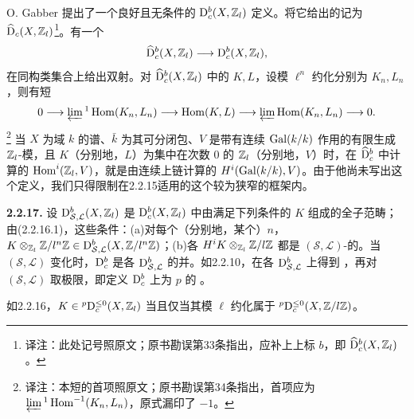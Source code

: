 O. Gabber 提出了一个良好且无条件的 $\mathrm{D}_c^b(X,\mathbb Z_l)$ 定义。将它给出的记为 $\widehat{\mathrm{D}}_c(X,\mathbb Z_l)$\footnote{译注：此处记号照原文；原书勘误第33条指出，应补上上标 $b$，即 $\widehat{\mathrm{D}}_c^b(X,\mathbb Z_l)$。}。有一个
\[
 \widehat{\mathrm{D}}_c^b(X,\mathbb Z_l)\longrightarrow\mathrm{D}_c^b(X,\mathbb Z_l),
\]
在同构类集合上给出双射。对 $\widehat{\mathrm{D}}_c^b(X,\mathbb Z_l)$ 中的 $K,L$，设模 $\ell^n$ 约化分别为 $K_n,L_n$，则有短
\[
 0\longrightarrow\varprojlim{}^1\operatorname{Hom}(K_n,L_n)
 \longrightarrow\operatorname{Hom}(K,L)\longrightarrow\varprojlim\operatorname{Hom}(K_n,L_n)
 \longrightarrow0.
\]
\noindent\footnote{译注：本短的首项照原文；原书勘误第34条指出，首项应为 $\varprojlim{}^1\operatorname{Hom}^{-1}(K_n,L_n)$，原式漏印了 $-1$。}
当 $X$ 为域 $k$ 的谱、$\bar k$ 为其可分闭包、$V$ 是带有连续 $\operatorname{Gal}(\relax k/k)$ 作用的有限生成 $\mathbb Z_l$-模，且 $K$（分别地，$L$）为集中在次数 $0$ 的 $\mathbb Z_l$（分别地，$V$）时，在 $\widehat{\mathrm{D}}_c^b$ 中计算的 $\operatorname{Hom}^i(\mathbb Z_l,V)$，就是由连续上链计算的 $H^i(\operatorname{Gal}(\relax k/k),V)$。由于他尚未写出这个定义，我们只得限制在2.2.15适用的这个较为狭窄的框架内。

\par\medskip\noindent\textbf{2.2.17.} 设 $\mathrm{D}_{\mathcal S,\mathcal L}^b(X,\mathbb Z_l)$ 是 $\mathrm{D}_c^b(X,\mathbb Z_l)$ 中由满足下列条件的 $K$ 组成的全子范畴；由(2.2.16.1)，这些条件：(a)对每个（分别地，某个）$n$，$K\otimes_{\mathbb Z_l}\mathbb Z/l^n\mathbb Z\in\mathrm{D}_{\mathcal S,\mathcal L}^b(X,\mathbb Z/l^n\mathbb Z)$；(b)各 $H^iK\otimes_{\mathbb Z_l}\mathbb Z/l\mathbb Z$ 都是 $(\mathcal S,\mathcal L)$-的。当 $(\mathcal S,\mathcal L)$ 变化时，$\mathrm{D}_c^b$ 是各 $\mathrm{D}_{\mathcal S,\mathcal L}^b$ 的并。如2.2.10，在各 $\mathrm{D}_{\mathcal S,\mathcal L}^b$ 上得到 ，再对 $(\mathcal S,\mathcal L)$ 取极限，即定义 $\mathrm{D}_c^b$ 上为 $p$ 的 。

如2.2.16，$K\in{}^p\mathrm{D}_c^{\leq0}(X,\mathbb Z_l)$ 当且仅当其模 $\ell$ 约化属于 ${}^p\mathrm{D}_c^{\leq0}(X,\mathbb Z/l\mathbb Z)$。

